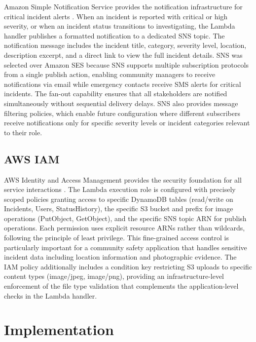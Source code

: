 \documentclass[conference]{IEEEtran}
\begin{document}
Amazon Simple Notification Service provides the notification infrastructure for critical incident alerts \cite{awssns}. When an incident is reported with critical or high severity, or when an incident status transitions to investigating, the Lambda handler publishes a formatted notification to a dedicated SNS topic. The notification message includes the incident title, category, severity level, location, description excerpt, and a direct link to view the full incident details. SNS was selected over Amazon SES because SNS supports multiple subscription protocols from a single publish action, enabling community managers to receive notifications via email while emergency contacts receive SMS alerts for critical incidents. The fan-out capability ensures that all stakeholders are notified simultaneously without sequential delivery delays. SNS also provides message filtering policies, which enable future configuration where different subscribers receive notifications only for specific severity levels or incident categories relevant to their role.

\subsection{AWS IAM}

AWS Identity and Access Management provides the security foundation for all service interactions \cite{awsiam}. The Lambda execution role is configured with precisely scoped policies granting access to specific DynamoDB tables (read/write on Incidents, Users, StatusHistory), the specific S3 bucket and prefix for image operations (PutObject, GetObject), and the specific SNS topic ARN for publish operations. Each permission uses explicit resource ARNs rather than wildcards, following the principle of least privilege. This fine-grained access control is particularly important for a community safety application that handles sensitive incident data including location information and photographic evidence. The IAM policy additionally includes a condition key restricting S3 uploads to specific content types (image/jpeg, image/png), providing an infrastructure-level enforcement of the file type validation that complements the application-level checks in the Lambda handler.

\section{Implementation}
\end{document}
